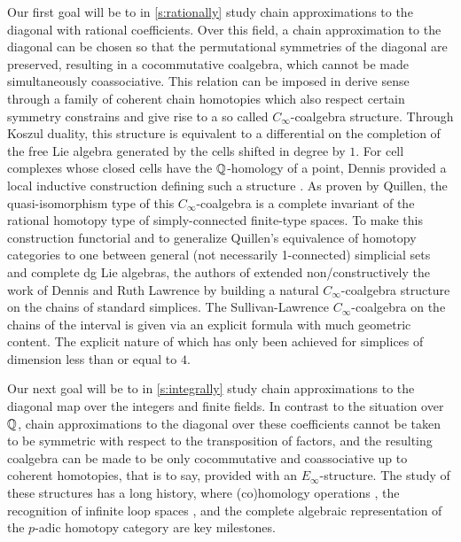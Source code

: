 Our first goal will be to in \cref{s:rationally} study chain approximations to the diagonal with rational coefficients.
Over this field, a chain approximation to the diagonal can be chosen so that the permutational symmetries of the diagonal are preserved, resulting in a cocommutative coalgebra, which cannot be made simultaneously coassociative.
This relation can be imposed in derive sense through a family of coherent chain homotopies which also respect certain symmetry constrains and give rise to a so called $C_\infty$-coalgebra structure.
Through Koszul duality, this structure is equivalent to a differential on the completion of the free Lie algebra generated by the cells shifted in degree by $1$.
For cell complexes whose closed cells have the $\mathbb{Q}$-homology of a point, Dennis provided a local inductive construction defining such a structure \cite{sullivan2007appendix}.
As proven by Quillen, the quasi-isomorphism type of this $C_\infty$-coalgebra is a complete invariant of the rational homotopy type of simply-connected finite-type spaces.
To make this construction functorial and to generalize Quillen's equivalence of homotopy categories to one between general (not necessarily 1-connected) simplicial sets and complete dg Lie algebras, the authors of \cite{buijs2020liemodels} extended non\-/constructively the work of Dennis and Ruth Lawrence \cite{lawrence2014interval} by building a natural $C_\infty$-coalgebra structure on the chains of standard simplices.
The Sullivan-Lawrence $C_\infty$-coalgebra on the chains of the interval is given via an explicit formula with much geometric content.
The explicit nature of which has only been achieved for simplices of dimension less than or equal to $4$.

Our next goal will be to in \cref{s:integrally} study chain approximations to the diagonal map over the integers and finite fields.
In contrast to the situation over $\mathbb{Q}$, chain approximations to the diagonal over these coefficients cannot be taken to be symmetric with respect to the transposition of factors, and the resulting coalgebra can be made to be only cocommutative and coassociative up to coherent homotopies, that is to say, provided with an $E_\infty$-structure.
The study of these structures has a long history, where (co)homology operations \cite{steenrod1962cohomology, may1970general}, the recognition of infinite loop spaces \cite{boardman1973homotopy, may1972geometry}, and the complete algebraic representation of the $p$-adic homotopy category \cite{mandell2001padic} are key milestones.

